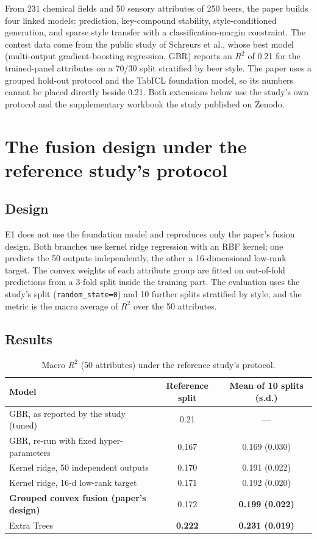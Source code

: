 From 231 chemical fields and 50 sensory attributes of 250 beers, the paper builds four linked models: prediction, key-compound stability, style-conditioned generation, and sparse style transfer with a classification-margin constraint. The contest data come from the public study of Schreurs et al.\cite{schreurs2024}, whose best model (multi-output gradient-boosting regression, GBR) reports an $R^2$ of 0.21 for the trained-panel attributes on a 70/30 split stratified by beer style. The paper uses a grouped hold-out protocol and the TabICL foundation model, so its numbers cannot be placed directly beside 0.21. Both extensions below use the study's own protocol and the supplementary workbook the study published on Zenodo\cite{zenodo2024}.

\section{The fusion design under the reference study's protocol}

\subsection{Design}
E1 does not use the foundation model and reproduces only the paper's fusion design. Both branches use kernel ridge regression with an RBF kernel; one predicts the 50 outputs independently, the other a 16-dimensional low-rank target. The convex weights of each attribute group are fitted on out-of-fold predictions from a 3-fold split inside the training part. The evaluation uses the study's split (\texttt{random\_state=0}) and 10 further splits stratified by style, and the metric is the macro average of $R^2$ over the 50 attributes.

\subsection{Results}
\begin{table}[htbp]\centering\small
\caption{Macro $R^2$ (50 attributes) under the reference study's protocol.}\label{tab:mc-e1}
\begin{tabular}{lcc}\toprule
Model & Reference split & Mean of 10 splits (s.d.)\\\midrule
GBR, as reported by the study (tuned) & 0.21 & ---\\
GBR, re-run with fixed hyper-parameters & 0.167 & 0.169 (0.030)\\
Kernel ridge, 50 independent outputs & 0.170 & 0.191 (0.022)\\
Kernel ridge, 16-d low-rank target & 0.171 & 0.192 (0.020)\\
\textbf{Grouped convex fusion (paper's design)} & 0.172 & \textbf{0.199 (0.022)}\\
Extra Trees & \textbf{0.222} & \textbf{0.231 (0.019)}\\\bottomrule
\end{tabular}
\end{table}

